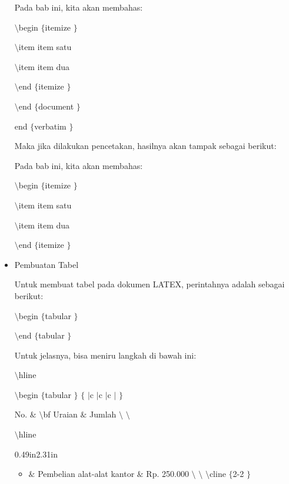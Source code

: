 \begin{itemize}
\vspace{10pt}
{\fontsize{10pt}{10pt}\selectfont Pada bab ini, kita akan membahas:} \par
{\fontsize{10pt}{10pt}\selectfont  $  \setminus  $begin $  \{  $itemize $  \}  $} \par
{\fontsize{10pt}{10pt}\selectfont  $  \setminus  $item item satu} \par
{\fontsize{10pt}{10pt}\selectfont  $  \setminus  $item item dua} \par
{\fontsize{10pt}{10pt}\selectfont  $  \setminus  $end $  \{  $itemize $  \}  $} \par
{\fontsize{10pt}{10pt}\selectfont  $  \setminus  $end $  \{  $document $  \}  $} \par
{\fontsize{10pt}{10pt}\selectfont end $  \{  $verbatim $  \}  $} \par
\vspace{10pt}
{\fontsize{10pt}{10pt}\selectfont Maka jika dilakukan pencetakan, hasilnya akan tampak sebagai berikut:} \par
{\fontsize{10pt}{10pt}\selectfont Pada bab ini, kita akan membahas:} \par
{\fontsize{10pt}{10pt}\selectfont  $  \setminus  $begin $  \{  $itemize $  \}  $} \par
{\fontsize{10pt}{10pt}\selectfont  $  \setminus  $item item satu} \par
{\fontsize{10pt}{10pt}\selectfont  $  \setminus  $item item dua} \par
{\fontsize{10pt}{10pt}\selectfont  $  \setminus  $end $  \{  $itemize $  \}  $} \par
\vspace{10pt}
\noindent 
\item Pembuatan Tabel \par
{\fontsize{11pt}{11pt}\selectfont Untuk membuat tabel pada dokumen LATEX, perintahnya adalah sebagai berikut: \par
{\fontsize{10pt}{10pt}\selectfont  $  \setminus  $begin $  \{  $tabular $  \}  $} \par
{\fontsize{10pt}{10pt}\selectfont  $  \setminus  $end $  \{  $tabular $  \}  $} \par
\vspace{12pt}
Untuk jelasnya, bisa meniru langkah di bawah ini: \par
{\fontsize{10pt}{10pt}\selectfont  $  \setminus  $hline} \par
{\fontsize{10pt}{10pt}\selectfont  $  \setminus  $begin $  \{  $tabular $  \}  $ $  \{  $ $  \vert  $c $  \vert  $c $  \vert  $c $  \vert  $ $  \}  $} \par
{\fontsize{10pt}{10pt}\selectfont No.  $  \&  $  $  \setminus  $bf Uraian  $  \&  $ Jumlah  $  \setminus  $ $  \setminus  $} \par
{\fontsize{10pt}{10pt}\selectfont  $  \setminus  $hline} \par
{0.49in}{2.31in}
\begin{itemize}
\item {\fontsize{10pt}{10pt}\selectfont  $  \&  $ Pembelian alat-alat kantor  $  \&  $ Rp. 250.000  $  \setminus  $ $  \setminus  $  $  \setminus  $cline $  \{  $2-2 $  \}  $}\end{itemize}

}
\end{itemize}
